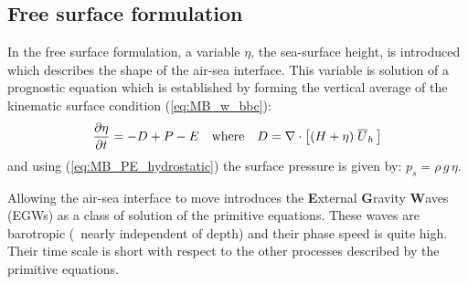 \documentclass[../main/NEMO_manual]{subfiles}
\begin{document}
\subsection{Free surface formulation}
\label{subsec:MB_free_surface}

In the free surface formulation, a variable $\eta$, the sea-surface height,
is introduced which describes the shape of the air-sea interface.
This variable is solution of a prognostic equation which is established by
forming the vertical average of the kinematic surface condition (\autoref{eq:MB_w_bbc}):
\begin{equation}
  \label{eq:MB_ssh}
  \pd[\eta]{t} = - D + P - E \quad \text{where} \quad D = \nabla \cdot \lt[ (H + \eta) \; \overline{U}_h \, \rt]
\end{equation}
and using (\autoref{eq:MB_PE_hydrostatic}) the surface pressure is given by:
$p_s = \rho \, g \, \eta$.

Allowing the air-sea interface to move introduces
the \textbf{E}xternal \textbf{G}ravity \textbf{W}aves (EGWs) as
a class of solution of the primitive equations.
These waves are barotropic (\ie\ nearly independent of depth) and their phase speed is quite high.
Their time scale is short with respect to the other processes described by the primitive equations.
\end{document}
